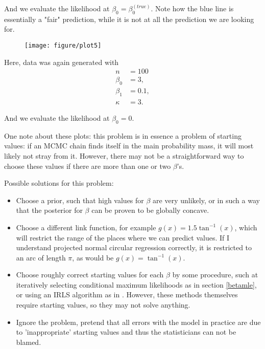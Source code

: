\documentclass{article}\usepackage[]{graphicx}\usepackage[]{color}
\makeatletter
\def\maxwidth{ %
  \ifdim\Gin@nat@width>\linewidth
    \linewidth
  \else
    \Gin@nat@width
  \fi
}
\newenvironment{knitrout}{}{} %
\makeatother
\begin{document}
And we evaluate the likelihood at $\beta_0 = \beta_0^{(true)}$. Note how the blue line is essentially a "fair" prediction, while it is not at all the prediction we are looking for.


\newpage

\begin{figure}[t!]
\begin{knitrout}
\color{fgcolor}

{\centering \texttt{[image: figure/plot5]} 

}



\end{knitrout}

\end{figure}


Here, data was again generated with
\begin{align*}
n &= 100 \\
\beta_0 &= 3, \\
\beta_1 &= 0.1, \\
\kappa &= 3.
\end{align*}

And we evaluate the likelihood at $\beta_0 = 0$.

One note about these plots: this problem is in essence a problem of starting values: if an MCMC chain finds itself in the main probability mass, it will most likely not stray from it. However, there may not be a straightforward way to choose these values if there are more than one or two $\beta$'s.

Possible solutions for this problem:

\begin{itemize}
\item Choose a prior, such that high values for $\beta$ are very unlikely, or in such a way that the posterior for $\beta$ can be proven to be globally concave.
\item Choose a different link function, for example $g(x) = 1.5 \tan^{-1} (x)$, which will restrict the range of the places where we can predict values. If I understand projected normal circular regression correctly, it is restricted to an arc of length $\pi$, as would be $g(x) = \tan^{-1} (x)$.
\item Choose roughly correct starting values for each $\beta$ by some procedure, such at iteratively selecting conditional maximum likelihoods as in section \ref{betamle}, or using an IRLS algorithm as in \citet{gill2010}. However, these methods themselves require starting values, so they may not solve anything.
\item Ignore the problem, pretend that all errors with the model in practice are due to 'inappropriate' starting values and thus the statisticians can not be blamed.
\end{itemize}
\end{document}
